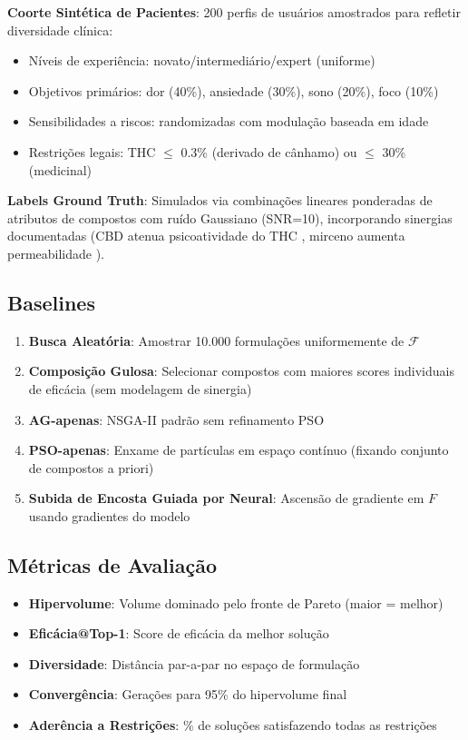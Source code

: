 \documentclass[11pt,a4paper]{article}
\begin{document}
\textbf{Coorte Sintética de Pacientes}: 200 perfis de usuários amostrados para refletir diversidade clínica:
\begin{itemize}
    \item Níveis de experiência: novato/intermediário/expert (uniforme)
    \item Objetivos primários: dor (40\%), ansiedade (30\%), sono (20\%), foco (10\%)
    \item Sensibilidades a riscos: randomizadas com modulação baseada em idade
    \item Restrições legais: THC $\leq$ 0.3\% (derivado de cânhamo) ou $\leq$ 30\% (medicinal)
\end{itemize}

\textbf{Labels Ground Truth}: Simulados via combinações lineares ponderadas de atributos de compostos com ruído Gaussiano (SNR=10), incorporando sinergias documentadas (CBD atenua psicoatividade do THC \cite{Niesink2013}, mirceno aumenta permeabilidade \cite{DoVale2002}).

\subsection{Baselines}

\begin{enumerate}
    \item \textbf{Busca Aleatória}: Amostrar 10.000 formulações uniformemente de $\mathcal{F}$
    \item \textbf{Composição Gulosa}: Selecionar compostos com maiores scores individuais de eficácia (sem modelagem de sinergia)
    \item \textbf{AG-apenas}: NSGA-II padrão sem refinamento PSO
    \item \textbf{PSO-apenas}: Enxame de partículas em espaço contínuo (fixando conjunto de compostos a priori)
    \item \textbf{Subida de Encosta Guiada por Neural}: Ascensão de gradiente em $F$ usando gradientes do modelo
\end{enumerate}

\subsection{Métricas de Avaliação}

\begin{itemize}
    \item \textbf{Hipervolume}: Volume dominado pelo fronte de Pareto (maior = melhor)
    \item \textbf{Eficácia@Top-1}: Score de eficácia da melhor solução
    \item \textbf{Diversidade}: Distância par-a-par no espaço de formulação
    \item \textbf{Convergência}: Gerações para 95\% do hipervolume final
    \item \textbf{Aderência a Restrições}: \% de soluções satisfazendo todas as restrições
\end{itemize}
\end{document}
